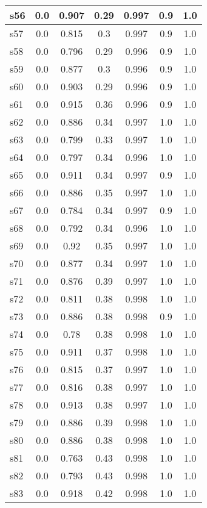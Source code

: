 \documentclass{article}
\begin{document}
\begin{tabular}{|l|c|c|c|c|c|c|}
\hline
s56 &0.0 & 0.907 & 0.29 & 0.997 & 0.9 & 1.0\\
\hline
s57 &0.0 & 0.815 & 0.3 & 0.997 & 0.9 & 1.0\\
\hline
s58 &0.0 & 0.796 & 0.29 & 0.996 & 0.9 & 1.0\\
\hline
s59 &0.0 & 0.877 & 0.3 & 0.996 & 0.9 & 1.0\\
\hline
s60 &0.0 & 0.903 & 0.29 & 0.996 & 0.9 & 1.0\\
\hline
s61 &0.0 & 0.915 & 0.36 & 0.996 & 0.9 & 1.0\\
\hline
s62 &0.0 & 0.886 & 0.34 & 0.997 & 1.0 & 1.0\\
\hline
s63 &0.0 & 0.799 & 0.33 & 0.997 & 1.0 & 1.0\\
\hline
s64 &0.0 & 0.797 & 0.34 & 0.996 & 1.0 & 1.0\\
\hline
s65 &0.0 & 0.911 & 0.34 & 0.997 & 0.9 & 1.0\\
\hline
s66 &0.0 & 0.886 & 0.35 & 0.997 & 1.0 & 1.0\\
\hline
s67 &0.0 & 0.784 & 0.34 & 0.997 & 0.9 & 1.0\\
\hline
s68 &0.0 & 0.792 & 0.34 & 0.996 & 1.0 & 1.0\\
\hline
s69 &0.0 & 0.92 & 0.35 & 0.997 & 1.0 & 1.0\\
\hline
s70 &0.0 & 0.877 & 0.34 & 0.997 & 1.0 & 1.0\\
\hline
s71 &0.0 & 0.876 & 0.39 & 0.997 & 1.0 & 1.0\\
\hline
s72 &0.0 & 0.811 & 0.38 & 0.998 & 1.0 & 1.0\\
\hline
s73 &0.0 & 0.886 & 0.38 & 0.998 & 0.9 & 1.0\\
\hline
s74 &0.0 & 0.78 & 0.38 & 0.998 & 1.0 & 1.0\\
\hline
s75 &0.0 & 0.911 & 0.37 & 0.998 & 1.0 & 1.0\\
\hline
s76 &0.0 & 0.815 & 0.37 & 0.997 & 1.0 & 1.0\\
\hline
s77 &0.0 & 0.816 & 0.38 & 0.997 & 1.0 & 1.0\\
\hline
s78 &0.0 & 0.913 & 0.38 & 0.997 & 1.0 & 1.0\\
\hline
s79 &0.0 & 0.886 & 0.39 & 0.998 & 1.0 & 1.0\\
\hline
s80 &0.0 & 0.886 & 0.38 & 0.998 & 1.0 & 1.0\\
\hline
s81 &0.0 & 0.763 & 0.43 & 0.998 & 1.0 & 1.0\\
\hline
s82 &0.0 & 0.793 & 0.43 & 0.998 & 1.0 & 1.0\\
\hline
s83 &0.0 & 0.918 & 0.42 & 0.998 & 1.0 & 1.0\\

\end{tabular}
\end{document}
